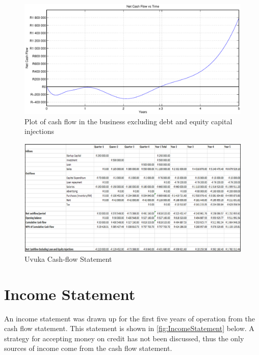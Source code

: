 \begin{figure}[H]
\centering
\includegraphics[width=1\textwidth]{images/cashflow_plot}
\vskip10pt
\caption[Cash-flow plot]{Plot of cash flow in the business excluding debt and equity capital injections}
\label{fig:cashflowplot}
\end{figure}

\newpage
\thispagestyle{plain}
\begin{landscape}
  \begin{figure}[H]
    \centering
    \includegraphics[width=1.5\textwidth]{images/CashFlowStatement_horizontal}
    \vskip10pt
    \caption[Uvuka Cash-Flow Statement]{Uvuka Cash-flow Statement}
    \label{fig:CashFlowStatement_horizontal}
  \end{figure}
\end{landscape}
\newpage


\section{Income Statement}

An income statement was drawn up for the first five years of operation from the cash flow statement. This statement is shown in \cref{fig:IncomeStatement} below. A strategy for accepting money on credit has not been discussed, thus the only sources of income come from the cash flow statement. 

